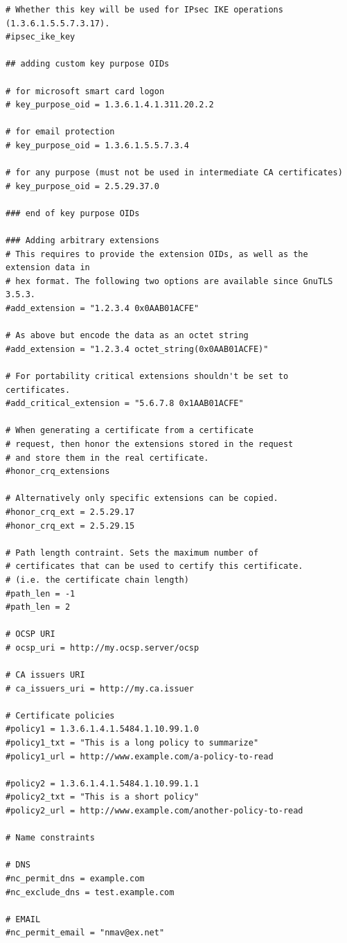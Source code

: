 \documentclass[10pt, a4paper]{report}
\begin{document}
\begin{verbatim}
# Whether this key will be used for IPsec IKE operations (1.3.6.1.5.5.7.3.17).
#ipsec_ike_key

## adding custom key purpose OIDs

# for microsoft smart card logon
# key_purpose_oid = 1.3.6.1.4.1.311.20.2.2

# for email protection
# key_purpose_oid = 1.3.6.1.5.5.7.3.4

# for any purpose (must not be used in intermediate CA certificates)
# key_purpose_oid = 2.5.29.37.0

### end of key purpose OIDs

### Adding arbitrary extensions
# This requires to provide the extension OIDs, as well as the extension data in
# hex format. The following two options are available since GnuTLS 3.5.3.
#add_extension = "1.2.3.4 0x0AAB01ACFE"

# As above but encode the data as an octet string
#add_extension = "1.2.3.4 octet_string(0x0AAB01ACFE)"

# For portability critical extensions shouldn't be set to certificates.
#add_critical_extension = "5.6.7.8 0x1AAB01ACFE"

# When generating a certificate from a certificate
# request, then honor the extensions stored in the request
# and store them in the real certificate.
#honor_crq_extensions

# Alternatively only specific extensions can be copied.
#honor_crq_ext = 2.5.29.17
#honor_crq_ext = 2.5.29.15

# Path length contraint. Sets the maximum number of
# certificates that can be used to certify this certificate.
# (i.e. the certificate chain length)
#path_len = -1
#path_len = 2

# OCSP URI
# ocsp_uri = http://my.ocsp.server/ocsp

# CA issuers URI
# ca_issuers_uri = http://my.ca.issuer

# Certificate policies
#policy1 = 1.3.6.1.4.1.5484.1.10.99.1.0
#policy1_txt = "This is a long policy to summarize"
#policy1_url = http://www.example.com/a-policy-to-read

#policy2 = 1.3.6.1.4.1.5484.1.10.99.1.1
#policy2_txt = "This is a short policy"
#policy2_url = http://www.example.com/another-policy-to-read

# Name constraints

# DNS
#nc_permit_dns = example.com
#nc_exclude_dns = test.example.com

# EMAIL
#nc_permit_email = "nmav@ex.net"


\end{verbatim}
\end{document}
